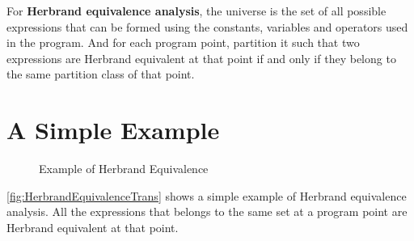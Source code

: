 For \textbf{Herbrand equivalence analysis}, the universe is the set 
of all possible expressions that can be formed using the constants, 
variables and operators used in the program. And for each program 
point, partition it such that two expressions are Herbrand equivalent 
at that point if and only if they belong to the same partition class 
of that point.

\section{A Simple Example}
\label{sec:ASimpleExample}

\begin{figure}[!ht]
    \caption{Example of Herbrand Equivalence}
    \label{fig:HerbrandEquivalenceTrans}
\end{figure}

\autoref{fig:HerbrandEquivalenceTrans} shows a simple example of Herbrand 
equivalence analysis. All the expressions that belongs to the same set at 
a program point are Herbrand equivalent at that point.

